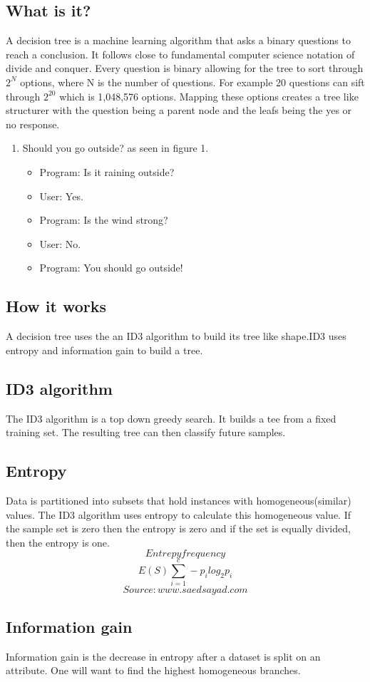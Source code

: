 \documentclass[a4paper]{article}
\begin{document}
\subsection{What is it?}
A decision tree is a machine learning algorithm that asks a binary questions to reach a conclusion. It follows close to fundamental computer science notation of divide and conquer. Every question is binary allowing for the tree to sort through $2^N$ options, where N is the number of questions. For example 20 questions can sift through $2^{20}$ which is 1,048,576 options. Mapping these options creates a tree like structurer with the question being a parent node and the leafs being the yes or no response.
\begin{enumerate}
\centering
\item Should you go outside? as seen in figure 1.
\begin{itemize}
\centering
  \item Program: Is it raining outside?
  \item User: Yes.
  \item Program: Is the wind strong?
  \item User: No.
  \item Program: You should go outside!
\end{itemize}
\end{enumerate}
\subsection{How it works}
A decision tree uses the an ID3 algorithm to build its tree like shape.ID3 uses entropy and information gain to build a tree.
\subsection{ID3 algorithm}
The ID3 algorithm is a top down greedy search. It builds a tee from a fixed training set. The resulting tree can then classify future samples.
\subsection{Entropy}
Data is partitioned into subsets that hold instances with homogeneous(similar) values. The ID3 algorithm uses entropy to calculate this homogeneous value. If the sample set is zero then the entropy is zero and if the set is equally divided, then the entropy is one. $$Entrepy frequency $$ $$E(S)\sum_{i=1}^{c} -p_{i} log_{2} p_{i}$$ $$Source: www.saedsayad.com$$
\subsection{Information gain}
Information gain is the decrease in entropy after a dataset is split on an attribute. One will want to find the highest homogeneous branches.
\end{document}
